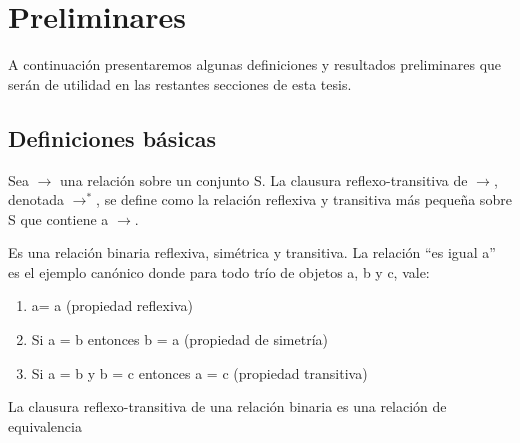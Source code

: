 \section{Preliminares}
\label{preliminares}
A continuación presentaremos algunas definiciones y resultados preliminares que serán de utilidad en las restantes secciones de esta tesis.

\subsection{Definiciones básicas}
\begin{definition} Sea $\rightarrow$ una relación sobre un conjunto S. La clausura reflexo-transitiva de $\rightarrow$, denotada  $\rightarrow^*$, se define como la relación reflexiva y transitiva más pequeña sobre S que contiene a $\rightarrow$. 
\end{definition} 
\begin{definition} Es una relación binaria reflexiva, simétrica y transitiva. La relación ``es igual a''  es el ejemplo canónico donde para todo trío de objetos a, b y c, vale: 

\begin{enumerate}
    \item a= a (propiedad reflexiva)
    \item Si a = b entonces b = a (propiedad de simetría)
    \item Si a = b y b = c entonces a = c (propiedad transitiva)
\end{enumerate}
\end{definition}

\begin{prop}
 La clausura reflexo-transitiva de una relación binaria es una relación de equivalencia
\end{prop}

